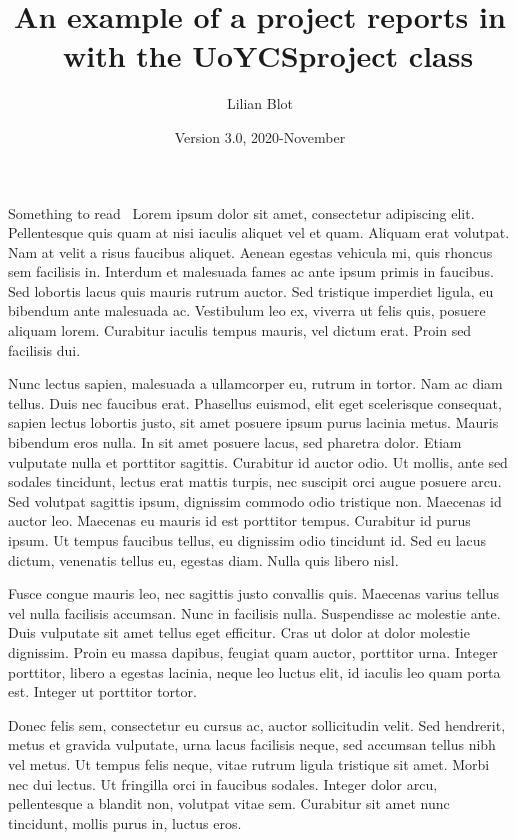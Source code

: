 \documentclass{UoYCSproject}
\author{Lilian Blot}
\title{An example of a project reports in \LaTeXe\ with the   \textsf{UoYCSproject} class}
\date{Version 3.0, 2020-November}
\begin{document}
\maketitle
\listoffigures
\listoftables

\begin{summary}
Something to read~\cite{zobel2015writing} Lorem ipsum dolor sit amet, consectetur adipiscing elit. Pellentesque quis quam at nisi iaculis aliquet vel et quam. Aliquam erat volutpat. Nam at velit a risus faucibus aliquet. Aenean egestas vehicula mi, quis rhoncus sem facilisis in. Interdum et malesuada fames ac ante ipsum primis in faucibus. Sed lobortis lacus quis mauris rutrum auctor. Sed tristique imperdiet ligula, eu bibendum ante malesuada ac. Vestibulum leo ex, viverra ut felis quis, posuere aliquam lorem. Curabitur iaculis tempus mauris, vel dictum erat. Proin sed facilisis dui.

Nunc lectus sapien, malesuada a ullamcorper eu, rutrum in tortor. Nam ac diam tellus. Duis nec faucibus erat. Phasellus euismod, elit eget scelerisque consequat, sapien lectus lobortis justo, sit amet posuere ipsum purus lacinia metus. Mauris bibendum eros nulla. In sit amet posuere lacus, sed pharetra dolor. Etiam vulputate nulla et porttitor sagittis. Curabitur id auctor odio. Ut mollis, ante sed sodales tincidunt, lectus erat mattis turpis, nec suscipit orci augue posuere arcu. Sed volutpat sagittis ipsum, dignissim commodo odio tristique non. Maecenas id auctor leo. Maecenas eu mauris id est porttitor tempus. Curabitur id purus ipsum. Ut tempus faucibus tellus, eu dignissim odio tincidunt id. Sed eu lacus dictum, venenatis tellus eu, egestas diam. Nulla quis libero nisl.

Fusce congue mauris leo, nec sagittis justo convallis quis. Maecenas varius tellus vel nulla facilisis accumsan. Nunc in facilisis nulla. Suspendisse ac molestie ante. Duis vulputate sit amet tellus eget efficitur. Cras ut dolor at dolor molestie dignissim. Proin eu massa dapibus, feugiat quam auctor, porttitor urna. Integer porttitor, libero a egestas lacinia, neque leo luctus elit, id iaculis leo quam porta est. Integer ut porttitor tortor.

Donec felis sem, consectetur eu cursus ac, auctor sollicitudin velit. Sed hendrerit, metus et gravida vulputate, urna lacus facilisis neque, sed accumsan tellus nibh vel metus. Ut tempus felis neque, vitae rutrum ligula tristique sit amet. Morbi nec dui lectus. Ut fringilla orci in faucibus sodales. Integer dolor arcu, pellentesque a blandit non, volutpat vitae sem. Curabitur sit amet nunc tincidunt, mollis purus in, luctus eros.


\end{summary}
\end{document}
